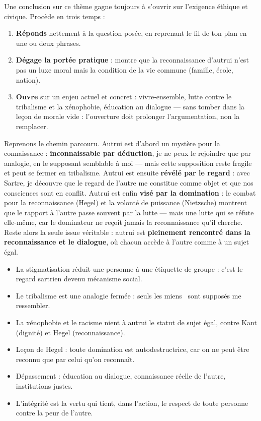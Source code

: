 \documentclass[11pt]{article}
\newcommand{\cle}[1]{{\popxbold\color{popdark}#1}}
\newcounter{popsec}
\newcounter{popsub}
\newcommand{\courssub}[1]{%
  \stepcounter{popsub}%
  \par\vspace{9pt}\noindent{\popxbold\fontsize{11.5}{13}\selectfont\color{popink}{\color{poporange}\thepopsec.\thepopsub}\hspace{6pt}#1}\par\nopagebreak\vspace{4pt}
}
\begin{document}
\begin{methode}
Une conclusion sur ce thème gagne toujours à s'ouvrir sur l'exigence éthique et civique. Procède en trois temps :
\begin{enumerate}
\item \textbf{Réponds} nettement à la question posée, en reprenant le fil de ton plan en une ou deux phrases.
\item \textbf{Dégage la portée pratique} : montre que la reconnaissance d'autrui n'est pas un luxe moral mais la condition de la vie commune (famille, école, nation).
\item \textbf{Ouvre} sur un enjeu actuel et concret : vivre-ensemble, lutte contre le tribalisme et la xénophobie, éducation au dialogue — sans tomber dans la leçon de morale vide : l'ouverture doit prolonger l'argumentation, non la remplacer.
\end{enumerate}
\end{methode}

\courssub{Bilan de la leçon}

Reprenons le chemin parcouru. Autrui est d'abord un mystère pour la connaissance : \textbf{inconnaissable par déduction}, je ne peux le rejoindre que par analogie, en le supposant semblable à moi — mais cette supposition reste fragile et peut se fermer en tribalisme. Autrui est ensuite \textbf{révélé par le regard} : avec Sartre, je découvre que le regard de l'autre me constitue comme objet et que nos consciences sont en conflit. Autrui est enfin \textbf{visé par la domination} : le combat pour la reconnaissance (Hegel) et la volonté de puissance (Nietzsche) montrent que le rapport à l'autre passe souvent par la lutte — mais une lutte qui se réfute elle-même, car le dominateur ne reçoit jamais la reconnaissance qu'il cherche. Reste alors la seule issue véritable : autrui est \textbf{pleinement rencontré dans la reconnaissance et le dialogue}, où chacun accède à l'autre comme à un sujet égal.

\begin{aretenir}
\begin{itemize}
\item La \cle{stigmatisation} réduit une personne à une étiquette de groupe : c'est le regard sartrien devenu mécanisme social.
\item Le \cle{tribalisme} est une analogie fermée : seuls \guillemotleft les miens \guillemotright\ sont supposés me ressembler.
\item La \cle{xénophobie} et le \cle{racisme} nient à autrui le statut de sujet égal, contre Kant (dignité) et Hegel (reconnaissance).
\item Leçon de Hegel : toute domination est autodestructrice, car on ne peut être reconnu que par celui qu'on reconnaît.
\item Dépassement : éducation au dialogue, connaissance réelle de l'autre, institutions justes.
\item L'\cle{intégrité} est la vertu qui tient, dans l'action, le respect de toute personne contre la peur de l'autre.
\end{itemize}
\end{aretenir}
\end{document}
